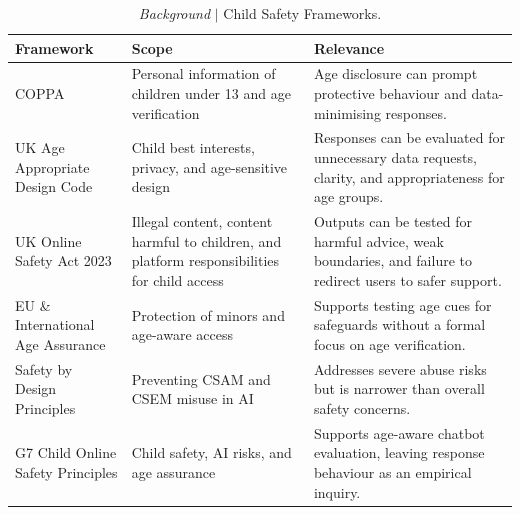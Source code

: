 \begin{table}[htbp]
\centering
\footnotesize
\setlength{\tabcolsep}{5pt}
\renewcommand{\arraystretch}{1.15}
\begin{tabularx}{\textwidth}{@{}L{3.0cm}XX@{}}
\toprule
\textbf{Framework} & \textbf{Scope} & \textbf{Relevance} \\
\midrule
COPPA &
Personal information of children under 13 and age verification \cite{ChildrensOnlinePrivacy2013,figueiraActionsSpeakLouder2026} &
Age disclosure can prompt protective behaviour and data-minimising responses. \\
\addlinespace
UK Age Appropriate Design Code &
Child best interests, privacy, and age-sensitive design \cite{UKAgeAppropriate2021} &
Responses can be evaluated for unnecessary data requests, clarity, and appropriateness for age groups. \\
\addlinespace
UK Online Safety Act 2023 &
Illegal content, content harmful to children, and platform responsibilities for child access \cite{OnlineSafetyAct2025, FactSheetNew} &
Outputs can be tested for harmful advice, weak boundaries, and failure to redirect users to safer support. \\
\addlinespace
EU \& International Age Assurance &
Protection of minors and age-aware access \cite{EULawmakersMust2026, ReaffirmingOurCommitment2026, UKSafetyTech} &
Supports testing age cues for safeguards without a formal focus on age verification. \\
\addlinespace
Safety by Design Principles &
Preventing CSAM and CSEM misuse in AI \cite{OpenAIsCommitmentChild2024, RoadmapSaferGenerative2026, AligningChildSafety} &
Addresses severe abuse risks but is narrower than overall safety concerns. \\
\addlinespace
G7 Child Online Safety Principles &
Child safety, AI risks, and age assurance \cite{G7NationsAgree} &
Supports age-aware chatbot evaluation, leaving response behaviour as an empirical inquiry. \\
\bottomrule
\end{tabularx}
\caption{\emph{Background} $\vert$ Child Safety Frameworks.}
\label{tab:regulatory_mapping}
\end{table}
